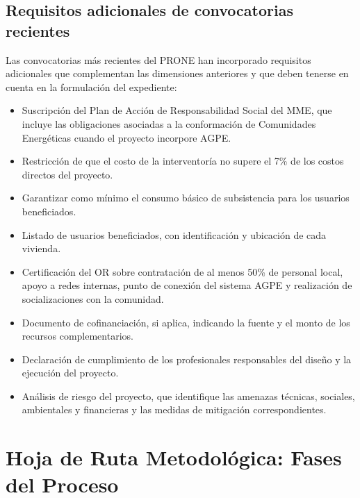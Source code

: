 \subsection{Requisitos adicionales de convocatorias recientes}
\label{subsec:req_adicionales}

Las convocatorias más recientes del PRONE han incorporado requisitos
adicionales que complementan las dimensiones anteriores y que deben
tenerse en cuenta en la formulación del expediente:

\begin{itemize}
    \item Suscripción del Plan de Acción de Responsabilidad Social del
    MME, que incluye las obligaciones asociadas a la conformación de
    Comunidades Energéticas cuando el proyecto incorpore AGPE.

    \item Restricción de que el costo de la interventoría no supere el
    7\% de los costos directos del proyecto.

    \item Garantizar como mínimo el consumo básico de subsistencia para
    los usuarios beneficiados.

    \item Listado de usuarios beneficiados, con identificación y
    ubicación de cada vivienda.

    \item Certificación del OR sobre contratación de al menos 50\% de
    personal local, apoyo a redes internas, punto de conexión del
    sistema AGPE y realización de socializaciones con la comunidad.

    \item Documento de cofinanciación, si aplica, indicando la fuente y
    el monto de los recursos complementarios.

    \item Declaración de cumplimiento de los profesionales responsables
    del diseño y la ejecución del proyecto.

    \item Análisis de riesgo del proyecto, que identifique las amenazas
    técnicas, sociales, ambientales y financieras y las medidas de
    mitigación correspondientes.
\end{itemize}


\section{Hoja de Ruta Metodológica: Fases del Proceso}
\label{sec:hoja_de_ruta}

